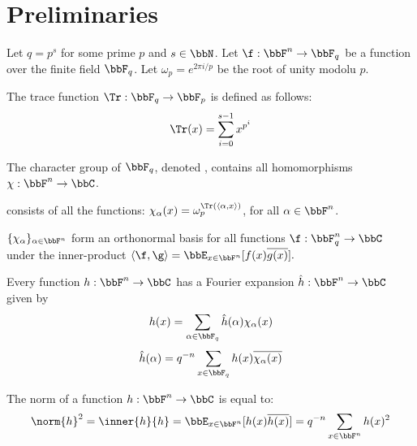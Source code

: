 
\section{Preliminaries}
\label{sec:prelim}

Let $q=p^s$ for some prime $p$ and $s\in \bbN$. Let $\f:\bbF^n\rightarrow\bbF_q$ be a function over the finite field $\bbF_q$. Let $\omega_p=e^{2\pi i/p}$ be the root of unity modolu $p$. 

\begin{definition}
The trace function $\Tr:\bbF_q\rightarrow\bbF_p$ is defined as follows:
$$\Tr(x) = \sum_{i=0}^{s-1}x^{p^i}$$
\end{definition}


\begin{definition}
The character group of $\bbF_q$, denoted \characters, contains all homomorphisms $\chi:\bbF^n\rightarrow \bbC$.
\end{definition}

\begin{fact}
\characters consists of all the functions:
$ \chi_{\alpha}(x) = \omega_p^{\Tr(\langle \alpha, x\rangle)}
 $, for all $\alpha\in\bbF^n$. 
\end{fact}

\begin{fact}
$\{\chi_\alpha\}_{\alpha\in \bbF^n}$ form an orthonormal basis for all functions $\f : \bbF^n_q \rightarrow \bbC$ under the inner-product $\langle \f,\g\rangle = \bbE_{x\in \bbF^n}[f(x)\overline{g(x)}].$
\end{fact}


\begin{definition}
Every function  $h:\bbF^n\rightarrow\bbC$ has a Fourier expansion $\hat{h}:\bbF^n\rightarrow\bbC$ given by
$$
h(x)=\sum_{\alpha\in\bbF_q}\hat{h}(\alpha)\chi_{\alpha}(x)
$$
$$
\hat{h}(\alpha)=q^{-n}\sum_{x\in\bbF_q}{h}(x)\overline{\chi_{\alpha}(x)}
$$
\end{definition}

\begin{definition}
The norm of a function  $h:\bbF^n\rightarrow\bbC$ is equal to:
\[
\norm{h}^2=\inner{h}{h}=\bbE_{x\in \bbF^n}[h(x)\overline{h(x)}]=q^{-n}\sum_{x\in\bbF^n}h(x)^2
\]
\end{definition}

